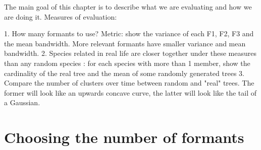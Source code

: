 \documentclass[../main.tex]{subfiles}
\begin{document}
 \label{chapter_results}
The main goal of this chapter is to describe what we are evaluating and how we are doing it. Measures of evaluation:

1. How many formants to use? Metric: show the variance of each F1, F2, F3 and the mean bandwidth. More relevant formants have smaller variance and mean bandwidth.
2. Species related in real life are closer together under these measures than any random species : for each species with more than 1 member, show the cardinality of the real tree and the mean of some randomly generated trees
3. Compare the number of clusters over time between random and "real" trees. The former will look like an upwards concave curve, the latter will look like the tail of a Gaussian.

\section{Choosing the number of formants} \label{section_choosing}
\end{document}
